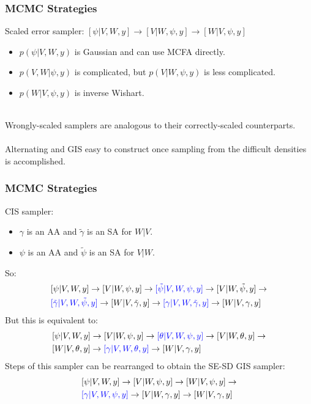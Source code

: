 \documentclass[xcolor=dvipsnames]{beamer}
\begin{document}
\begin{frame}
\frametitle{MCMC Strategies}
Scaled error sampler: {\color{blue}$[\psi|V,W,y] \to [V|W,\psi,y] \to [W|V,\psi,y]$}
\begin{itemize}
\item $p(\psi|V,W,y)$ is Gaussian and can use MCFA directly.
\item $p(V,W|\psi,y)$ is complicated, but $p(V|W,\psi,y)$ is less complicated. 
\item $p(W|V,\psi,y)$ is inverse Wishart.\\~\\
\end{itemize}

Wrongly-scaled samplers are analogous to their correctly-scaled counterparts.\\~\\

Alternating and GIS easy to construct once sampling from the difficult densities is accomplished.
\end{frame}

\begin{frame}
\frametitle{MCMC Strategies}
CIS sampler: 
\begin{itemize}
\item $\gamma$ is an AA and $\tilde{\gamma}$ is an SA for $W|V$.
\item $\psi$ is an AA and $\tilde{\psi}$ is an SA for $V|W$.
\end{itemize}
So:
\begin{align*}
&[\psi|V,W,y]\to[V|W,\psi,y]\to{\color{blue}[\tilde{\psi}|V,W,\psi,y]}\to[V|W,\tilde{\psi},y]\to\\
&{\color{blue}[\tilde{\gamma}|V,W,\tilde{\psi},y]}\to[W|V,\tilde{\gamma},y]\to{\color{blue}[\gamma|V,W,\tilde{\gamma},y]}\to[W|V,\gamma,y]
\end{align*}
But this is equivalent to:
\begin{align*}
&[\psi|V,W,y]\to[V|W,\psi,y]\to{\color{blue}[\theta|V,W,\psi,y]}\to[V|W,\theta,y]\to\\
&[W|V,\theta,y]\to{\color{blue}[\gamma|V,W,\theta,y]}\to[W|V,\gamma,y]
\end{align*}
Steps of this sampler can be rearranged to obtain the SE-SD GIS sampler:
\begin{align*}
&[\psi|V,W,y]\to[V|W,\psi,y]\to[W|V,\psi,y]\to\\
&{\color{blue}[\gamma|V,W,\psi,y]}\to[V|W,\gamma,y]\to[W|V,\gamma,y]
\end{align*}

\end{frame}
\end{document}
